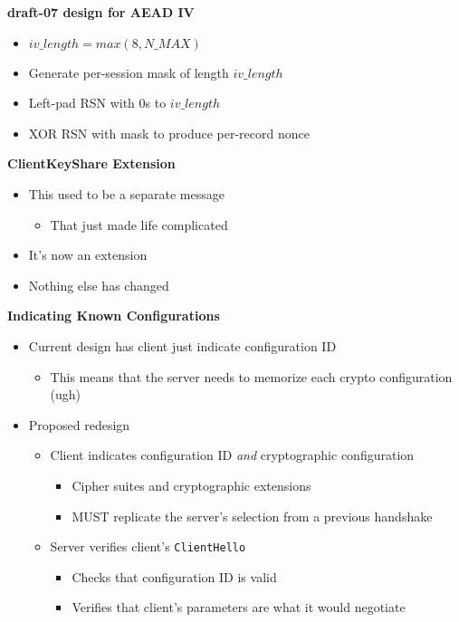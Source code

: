 \documentclass[helvetica]{seminar}
\newcommand{\heading}[1]{%
  \begin{center} 
    \large\bf 
    #1 
  \end{center} 
  \vspace{.4 in}}
\begin{document}
\begin{slide}
\heading{draft-07 design for AEAD IV}

\begin{itemize}
\item $iv\_length = max(8, N\_MAX)$
\item Generate per-session mask of length $iv\_length$
\item Left-pad RSN with 0s to $iv\_length$
\item XOR RSN with mask to produce per-record nonce
\end{itemize}
\end{slide}


\begin{slide}
\heading{ClientKeyShare Extension}

\begin{itemize}
\item This used to be a separate message
  \begin{itemize}
  \item That just made life complicated
  \end{itemize}

\item It's now an extension
\item Nothing else has changed
\end{itemize}
\end{slide}


\begin{slide}
\heading{Indicating Known Configurations}

\begin{itemize}
\item Current design has client just indicate configuration ID
  \begin{itemize}
  \item This means that the server needs to memorize each crypto configuration (ugh)
  \end{itemize}

\item Proposed redesign
  \begin{itemize}
  \item Client indicates configuration ID \emph{and} cryptographic configuration
    \begin{itemize}
    \item Cipher suites and cryptographic extensions
    \item MUST replicate the server's selection from a previous handshake
    \end{itemize}
  \item Server verifies client's \verb^ClientHello^
    \begin{itemize}
    \item Checks that configuration ID is valid
    \item Verifies that client's parameters are what it would negotiate
    \end{itemize}
  \end{itemize}
\end{itemize}
\end{slide}
\end{document}
